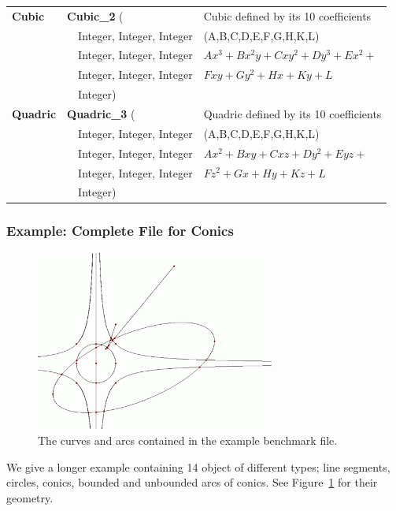 \begin{tabular}{*{3}{| l} |}
{\bf Cubic} & {\bf Cubic\_2} (        & Cubic defined by its 10 coefficients \\
      & \ \ Integer, Integer, Integer & (A,B,C,D,E,F,G,H,K,L)\\
      & \ \ Integer, Integer, Integer & \begin{math} Ax^3+Bx^2y+Cxy^2+Dy^3+Ex^2+ \end{math}\\
      & \ \ Integer, Integer, Integer & \begin{math}Fxy+Gy^2+Hx+Ky+L\end{math}\\
      & \ \ Integer)                  & \\ \hline

{\bf Quadric} & {\bf Quadric\_3} (      & Quadric defined by its 10 coefficients \\
        & \ \ Integer, Integer, Integer & (A,B,C,D,E,F,G,H,K,L)\\
        & \ \ Integer, Integer, Integer & \begin{math} Ax^2+Bxy+Cxz+Dy^2+Eyz+ \end{math}\\
        & \ \ Integer, Integer, Integer & \begin{math}Fz^2+Gx+Hy+Kz+L\end{math}\\
        & \ \ Integer)                  & \\ \hline
\end{tabular}

\subsubsection {Example: Complete File for Conics}
\label{longexample}

\begin{figure}
\centerline{\includegraphics[width=0.7\textwidth]{Benchmark/fig/Conics_14_1}}
\caption{The curves and arcs contained in the example benchmark file.
  \label{fig:example}}
\end{figure}

We give a longer example containing 14 object of different types; line
segments, circles, conics, bounded and unbounded arcs of conics. See
Figure~\ref{fig:example} for their geometry.

